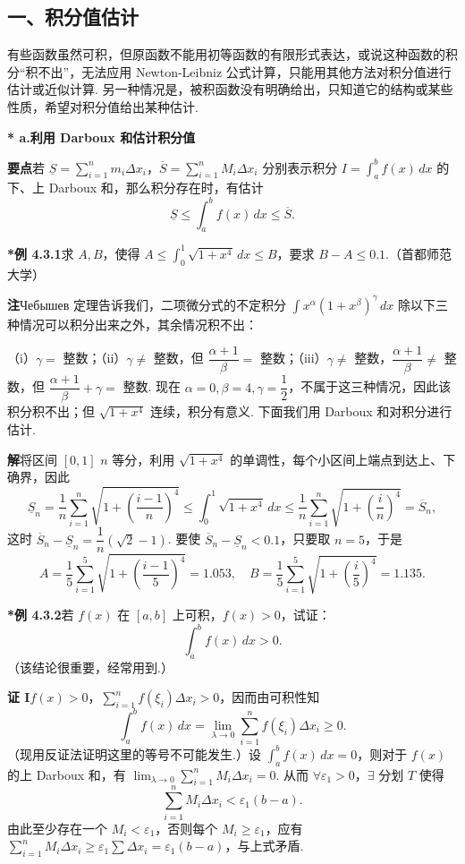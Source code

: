 \documentclass[UTF8,12pt,a4paper,fontset=fandol]{ctexart}
\begin{document}
\subsection*{一、积分值估计}

有些函数虽然可积，但原函数不能用初等函数的有限形式表达，或说这种函数的积分“积不出”，无法应用 Newton-Leibniz 公式计算，只能用其他方法对积分值进行估计或近似计算. 另一种情况是，被积函数没有明确给出，只知道它的结构或某些性质，希望对积分值给出某种估计.

\noindent\textbf{* a.\quad 利用 Darboux 和估计积分值}

\noindent\textbf{要点}\quad 若 $\underline S=\sum_{i=1}^n m_i\Delta x_i$，$\overline S=\sum_{i=1}^n M_i\Delta x_i$ 分别表示积分 $I=\int_a^b f(x)\,dx$ 的下、上 Darboux 和，那么积分存在时，有估计
\[
\underline S\le\int_a^b f(x)\,dx\le\overline S.
\]

\noindent\textbf{*例 4.3.1}\quad 求 $A,B$，使得 $A\le\int_0^1\sqrt{1+x^4}\,dx\le B$，要求 $B-A\le0.1$.（首都师范大学）

\noindent\textbf{注}\quad Чебышев 定理告诉我们，二项微分式的不定积分 $\int x^\alpha(1+x^\beta)^\gamma\,dx$ 除以下三种情况可以积分出来之外，其余情况积不出：

（i）$\gamma=$ 整数；（ii）$\gamma\ne$ 整数，但 $\dfrac{\alpha+1}{\beta}=$ 整数；（iii）$\gamma\ne$ 整数，$\dfrac{\alpha+1}{\beta}\ne$ 整数，但 $\dfrac{\alpha+1}{\beta}+\gamma=$ 整数. 现在 $\alpha=0,\beta=4,\gamma=\dfrac12$，不属于这三种情况，因此该积分积不出；但 $\sqrt{1+x^4}$ 连续，积分有意义. 下面我们用 Darboux 和对积分进行估计.

\noindent\textbf{解}\quad 将区间 $[0,1]$ $n$ 等分，利用 $\sqrt{1+x^4}$ 的单调性，每个小区间上端点到达上、下确界，因此
\[
\underline S_n=\frac1n\sum_{i=1}^n\sqrt{1+\left(\frac{i-1}{n}\right)^4}
\le\int_0^1\sqrt{1+x^4}\,dx
\le\frac1n\sum_{i=1}^n\sqrt{1+\left(\frac in\right)^4}
=\overline S_n,
\]
这时 $\overline S_n-\underline S_n=\dfrac1n(\sqrt2-1)$. 要使 $\overline S_n-\underline S_n<0.1$，只要取 $n=5$，于是
\[
A=\frac15\sum_{i=1}^5\sqrt{1+\left(\frac{i-1}{5}\right)^4}=1.053,\quad
B=\frac15\sum_{i=1}^5\sqrt{1+\left(\frac i5\right)^4}=1.135.
\]

\noindent\textbf{*例 4.3.2}\quad 若 $f(x)$ 在 $[a,b]$ 上可积，$f(x)>0$，试证：
\[
\int_a^b f(x)\,dx>0.
\]
（该结论很重要，经常用到.）

\noindent\textbf{证 I}\quad $f(x)>0$，$\sum_{i=1}^n f(\xi_i)\Delta x_i>0$，因而由可积性知
\[
\int_a^b f(x)\,dx=\lim_{\lambda\to0}\sum_{i=1}^n f(\xi_i)\Delta x_i\ge0.
\]
（现用反证法证明这里的等号不可能发生.）设 $\int_a^b f(x)\,dx=0$，则对于 $f(x)$ 的上 Darboux 和，有 $\lim_{\lambda\to0}\sum_{i=1}^n M_i\Delta x_i=0$. 从而 $\forall\varepsilon_1>0$，$\exists$ 分划 $T$ 使得
\[
\sum_{i=1}^nM_i\Delta x_i<\varepsilon_1(b-a).
\]
由此至少存在一个 $M_i<\varepsilon_1$，否则每个 $M_i\ge\varepsilon_1$，应有 $\sum_{i=1}^nM_i\Delta x_i\ge\varepsilon_1\sum\Delta x_i=\varepsilon_1(b-a)$，与上式矛盾.
\end{document}
